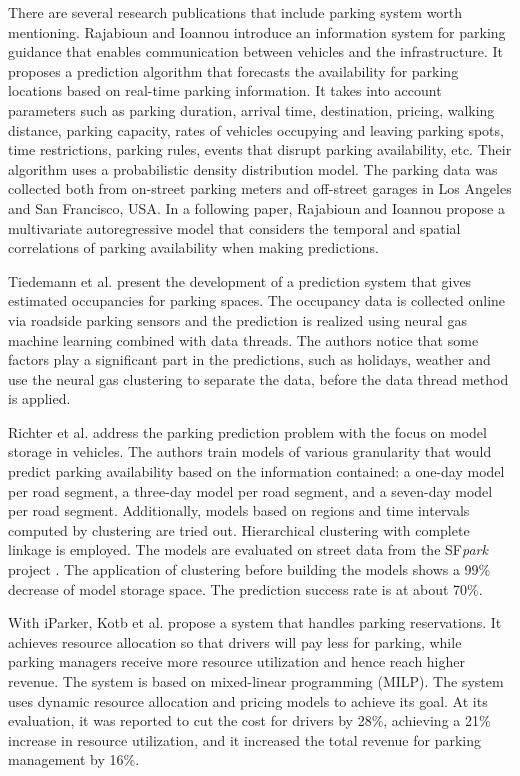 \documentclass{ws-ijait}
\newcommand{\cmmnt}[1]{\ignorespaces}
\begin{document}
	There are several research publications that include parking system worth mentioning. Rajabioun and Ioannou \cmmnt{ref rajabioun2013} introduce an information system for parking guidance that enables communication between vehicles and the infrastructure. It proposes a prediction algorithm that forecasts the availability for parking locations based on real-time parking information. It takes into account parameters such as parking duration, arrival time, destination, pricing, walking distance, parking capacity, rates of vehicles occupying and leaving parking spots, time restrictions, parking rules, events that disrupt parking availability, etc. Their algorithm uses a probabilistic density distribution model. The parking data was collected both from on-street parking meters and off-street garages in Los Angeles and San Francisco, USA. In a following paper, Rajabioun and Ioannou \cmmnt{ref rajabioun2015} propose a multivariate autoregressive model that considers the temporal and spatial correlations of parking availability when making predictions. 
	
	Tiedemann et al. \cmmnt{ref tiedemann} present the development of a prediction system that gives estimated occupancies for parking spaces. The occupancy data is collected online via roadside parking sensors and the prediction is realized using neural gas machine learning combined with data threads. The authors notice that some factors play a significant part in the predictions, such as holidays, weather and use the neural gas clustering to separate the data, before the data thread method is applied. 
	
	Richter et al. \cmmnt{ref richter} address the parking prediction problem with the focus on model storage in vehicles. The authors train models of various granularity that would predict parking availability based on the information contained: a one-day model per road segment, a three-day model per road segment, and a seven-day model per road segment. Additionally, models based on regions and time intervals computed by clustering are tried out. Hierarchical clustering with complete linkage is employed. The models are evaluated on street data from the SF\textit{park} project \cmmnt{ref sfpark_open_data}. The application of clustering before building the models shows a 99\% decrease of model storage space. The prediction success rate is at about 70\%. 
	
	With iParker, Kotb et al. \cmmnt{ref kotb} propose a system that handles parking reservations. It achieves resource allocation so that drivers will pay less for parking, while parking managers receive more resource utilization and hence reach higher revenue. The system is based on mixed-linear programming (MILP). The system uses dynamic resource allocation and pricing models to achieve its goal. At its evaluation, it was reported to cut the cost for drivers by 28\%, achieving a 21\% increase in resource utilization, and it increased the total revenue for parking management by 16\%. 
	
\end{document}
